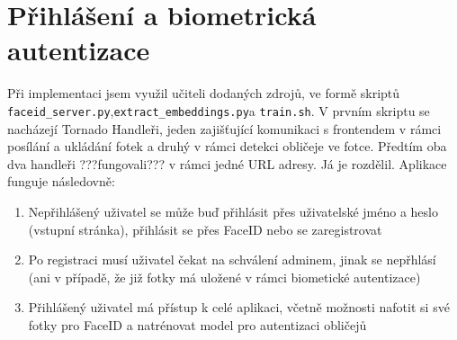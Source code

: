 \section{Přihlášení a biometrická autentizace}
Při implementaci jsem využil učiteli dodaných zdrojů, ve formě skriptů \verb|faceid_server.py|,\newline \verb|extract_embeddings.py|a \verb|train.sh|.
V prvním skriptu se nacházejí Tornado Handleři, jeden zajišťující komunikaci s frontendem v rámci posílání a ukládání fotek a druhý v rámci detekci obličeje ve fotce.
Předtím oba dva handleři ???fungovali??? v rámci jedné URL adresy. Já je rozdělil. Aplikace funguje následovně:
\begin{enumerate}
    \item Nepřihlášený uživatel se může buď přihlásit přes uživatelské jméno a heslo (vstupní stránka), přihlásit se přes FaceID nebo se zaregistrovat
    \item Po registraci musí uživatel čekat na schválení adminem, jinak se nepřhlásí (ani v případě, že již fotky má uložené v rámci biometické autentizace)
    \item Přihlášený uživatel má přístup k celé aplikaci, včetně možnosti nafotit si své fotky pro FaceID a natrénovat model pro autentizaci obličejů
\end{enumerate} 

